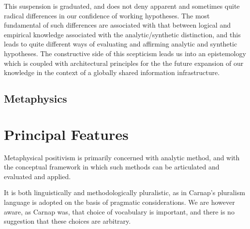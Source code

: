 This suspension is graduated, and does not deny apparent and
sometimes quite radical differences in our confidence of working
hypotheses.
The most fundamental of such differences are associated with that
between logical and empirical knowledge associated with the
analytic/synthetic distinction, and this leads to quite different ways
of evaluating and affirming analytic and synthetic hypotheses.
The constructive side of this scepticism leads us into an epistemology
which is coupled with architectural principles for the the future
expansion of our knowledge in the context of a globally shared
information infrastructure.

\subsection{Metaphysics}



\section{Principal Features}

Metaphysical positivism is primarily concerned with analytic method,
and with the conceptual framework in which such methods can be
articulated and evaluated and applied.

It is both linguistically and methodologically pluralistic, as in
Carnap's pluralism language is adopted on the basis of pragmatic
considerations.
We are however aware, as Carnap was, that choice of vocabulary is
important, and there is no suggestion that these choices are
arbitrary.

 
